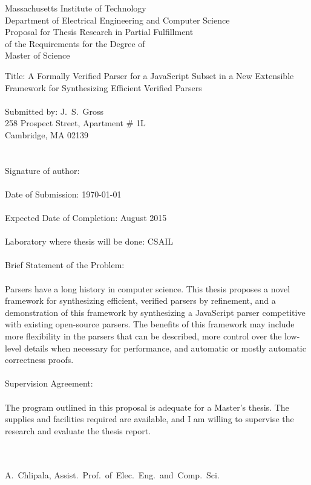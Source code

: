 \documentclass{article}
\begin{document}
\thispagestyle{empty}
\begin{center}
Massachusetts Institute of Technology \\
Department of Electrical Engineering and Computer Science \\ $\left.\right.$ \\
Proposal for Thesis Research in Partial Fulfillment \\
of the Requirements for the Degree of \\
Master of Science
\end{center}
\noindent Title: A Formally Verified Parser for a JavaScript Subset in a New Extensible Framework for Synthesizing Efficient Verified Parsers \\ \\
Submitted by: J.~S.~Gross \\
\phantom{Submitted by: }258 Prospect Street, Apartment \# 1L \\
\phantom{Submitted by: }Cambridge, MA 02139 \\ \\ \\
Signature of author: \underline{\hspace{20em}} \\ \\
Date of Submission: \today \\ \\
Expected Date of Completion: August 2015 \\ \\
Laboratory where thesis will be done: CSAIL \\ \\
Brief Statement of the Problem: \\ \\
Parsers have a long history in computer science.  This thesis proposes a novel framework for synthesizing efficient, verified parsers by refinement, and a demonstration of this framework by synthesizing a JavaScript parser competitive with existing open-source parsers.  The benefits of this framework may include more flexibility in the parsers that can be described, more control over the low-level details when necessary for performance, and automatic or mostly automatic correctness proofs. \\ \\
Supervision Agreement: \\ \\
The program outlined in this proposal is adequate for a Master's thesis. The supplies and facilities
required are available, and I am willing to supervise the research and evaluate the thesis report. \\ \\
\begin{flushright}
\underline{\hspace*{25em}} \\ $\left.\right.$ \\
A.~Chlipala, Assist.~Prof.~of~Elec.~Eng.~and~Comp.~Sci.
\end{flushright}
\clearpage
$\left.\right.$
\clearpage
\end{document}
